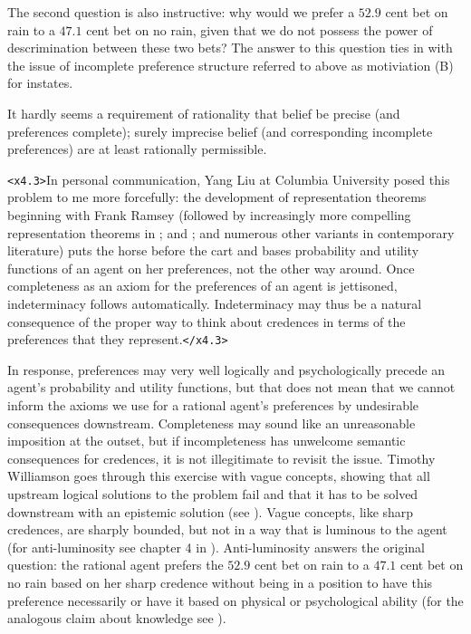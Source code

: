 \documentclass[11pt]{article}
\begin{document}
The second question is also instructive: why would we prefer a $52.9$
cent bet on rain to a $47.1$ cent bet on no rain, given that we do not
possess the power of descrimination between these two bets? The answer
to this question ties in with the issue of incomplete preference
structure referred to above as motiviation (B) for instates.

\begin{quotex}
  It hardly seems a requirement of rationality that belief be precise
  (and preferences complete); surely imprecise belief (and
  corresponding incomplete preferences) are at least rationally
  permissible. 
\end{quotex}

\texttt{<x4.3>}In personal communication, Yang Liu at Columbia
University posed this problem to me more forcefully: the development
of representation theorems beginning with Frank Ramsey (followed by
increasingly more compelling representation theorems in
; and ; and numerous other
variants in contemporary literature) puts the horse before the cart
and bases probability and utility functions of an agent on her
preferences, not the other way around. Once completeness as an axiom
for the preferences of an agent is jettisoned, indeterminacy follows
automatically. Indeterminacy may thus be a natural consequence of the
proper way to think about credences in terms of the preferences that
they represent.\texttt{</x4.3>}

In response, preferences may very well logically and psychologically
precede an agent's probability and utility functions, but that does
not mean that we cannot inform the axioms we use for a rational
agent's preferences by undesirable consequences downstream.
Completeness may sound like an unreasonable imposition at the outset,
but if incompleteness has unwelcome semantic consequences for
credences, it is not illegitimate to revisit the issue. Timothy
Williamson goes through this exercise with vague concepts, showing
that all upstream logical solutions to the problem fail and that it
has to be solved downstream with an epistemic solution (see
). Vague concepts, like sharp credences, are
sharply bounded, but not in a way that is luminous to the agent (for
anti-luminosity see chapter 4 in ).
Anti-luminosity answers the original question: the rational agent
prefers the $52.9$ cent bet on rain to a $47.1$ cent bet on no rain
based on her sharp credence without being in a position to have this
preference necessarily or have it based on physical or psychological
ability (for the analogous claim about knowledge see
).
\end{document}
